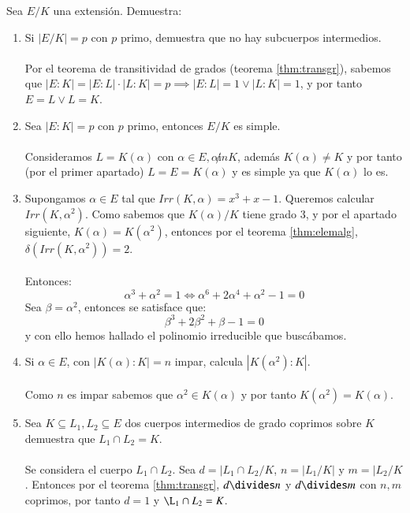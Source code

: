 \begin{ex}[H2.11]
    Sea $E/K$ una extensión. Demuestra:
    \begin{enumerate}
        \item Si $|E/K| = p$ con $p$ primo, demuestra que no hay subcuerpos intermedios.\\\\
        Por el teorema de transitividad de grados (teorema \ref{thm:transgr}), sabemos que $|E:K| = |E:L| \cdot |L:K| = p \implies |E:L| = 1 \lor |L:K| = 1$, y por tanto $E = L \lor L = K$.

        \item Sea $|E:K| = p$ con $p$ primo, entonces $E/K$ es simple.\\\\
        Consideramos $L = K(\alpha)$ con $\alpha \in E, \alpha \not in K$, además $K(\alpha) \neq K$ y por tanto (por el primer apartado) $L = E = K(\alpha)$ y es simple ya que $K(\alpha)$ lo es.

        \item Supongamos $\alpha \in E$ tal que $Irr(K, \alpha) = x^3 + x - 1$. Queremos calcular $Irr(K, \alpha^2)$. Como sabemos que $K(\alpha)/K$ tiene grado $3$, y por el apartado siguiente, $K(\alpha) = K(\alpha^2)$, entonces por el teorema \ref{thm:elemalg}, $\delta(Irr(K, \alpha^2))=2$.\\\\
        Entonces:
        $$
            \alpha^3 + \alpha^2 = 1 \iff \alpha^6 + 2\alpha^4 + \alpha^2 - 1 = 0
        $$
        Sea $\beta = \alpha^2$, entonces se satisface que:
        $$
            \beta^3 + 2\beta^2 + \beta - 1 = 0
        $$
        y con ello hemos hallado el polinomio irreducible que buscábamos.

        \item Si $\alpha \in E$, con $|K(\alpha):K| = n$ impar, calcula $|K(\alpha^2):K|$.\\\\
        Como $n$ es impar sabemos que $\alpha^2 \in K(\alpha)$ y por tanto $K(\alpha^2) = K(\alpha)$.\\

        \item Sea $K \subseteq L_1, L_2 \subseteq E$ dos cuerpos intermedios de grado coprimos sobre $K$ demuestra que $L_1 \cap L_2 = K$.\\\\
        Se considera el cuerpo $L_1 \cap L_2$. Sea $d = |L_1 \cap L_2 / K$, $n = |L_1/K|$ y $m=|L_2/K$. Entonces por el teorema \ref{thm:transgr}, $d \divides n$ y $d \divides m$ con $n, m$ coprimos, por tanto $d = 1$ y $\L_1 \cap L_2 = K$.
    \end{enumerate}
\end{ex}

